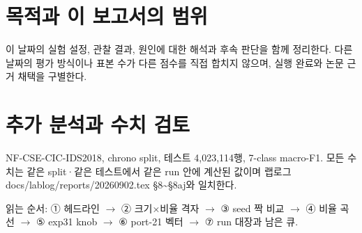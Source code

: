 




\section*{목적과 이 보고서의 범위}

이 날짜의 실험 설정, 관찰 결과, 원인에 대한 해석과 후속 판단을 함께 정리한다. 다른 날짜의 평가 방식이나 표본 수가 다른 점수를 직접 합치지 않으며, 실행 완료와 논문 근거 채택을 구별한다.


\section{추가 분석과 수치 검토}
NF-CSE-CIC-IDS2018, chrono split, 테스트 4,023,114행, 7-class macro-F1. 모든 수치는 같은 split·같은 테스트에서 같은 run 안에 계산된 값이며 랩로그 docs/\allowbreak{}lablog/\allowbreak{}reports/\allowbreak{}20260902.tex §8\textasciitilde{}§8aj와 일치한다.

읽는 순서: ① 헤드라인  \ensuremath{\rightarrow}  ② 크기×비율 격자  \ensuremath{\rightarrow}  ③ seed 짝 비교  \ensuremath{\rightarrow}  ④ 비율 곡선  \ensuremath{\rightarrow}  ⑤ exp31 knob  \ensuremath{\rightarrow}  ⑥ port-21 벡터  \ensuremath{\rightarrow}  ⑦ run 대장과 남은 큐.

